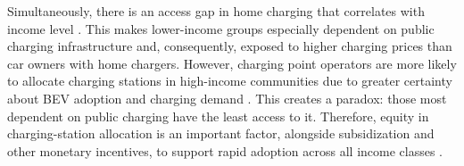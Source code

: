             
            
           Simultaneously, there is an access gap in home charging that correlates with income level \citep{ERMAGUN2024103622, HOPKINS2023113398}. This makes lower-income groups especially dependent on public charging infrastructure and, consequently, exposed to higher charging prices than car owners with home chargers. However, charging point operators are more likely to allocate charging stations in high-income communities due to greater certainty about \ac{BEV} adoption and charging demand \citep{STEFANIEC2025101495, GAZMEH2024104222}. This creates a paradox: those most dependent on public charging have the least access to it. Therefore, equity in charging-station allocation is an important factor, alongside subsidization and other monetary incentives, to support rapid adoption across all income classes \cite{HOPKINS2023113398}. %
            

